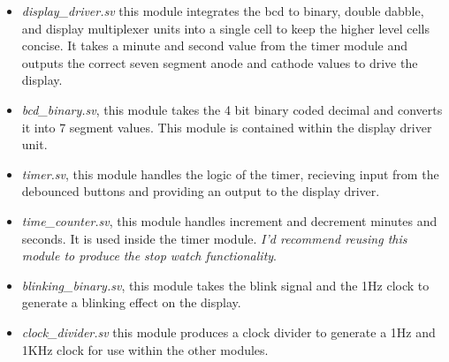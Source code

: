 \begin{itemize}
    \item \textit{display\_driver.sv} this module integrates the bcd to binary, double dabble, and display multiplexer units into a single cell to keep the higher level cells concise. It takes a minute and second value from the timer module and outputs the correct seven segment anode and cathode values to drive the display.
    
    \item \textit{bcd\_binary.sv}, this module takes the 4 bit binary coded decimal and converts it into 7 segment values. This module is contained within the display driver unit. 
    
    \item \textit{timer.sv}, this module handles the logic of the timer, recieving input from the debounced buttons and providing an output to the display driver. 
    
    \item \textit{time\_counter.sv}, this module handles increment and decrement minutes and seconds. It is used inside the timer module. \textit{I'd recommend reusing this module to produce the stop watch functionality}.
    
    \item \textit{blinking\_binary.sv}, this module takes the blink signal and the 1Hz clock to generate a blinking effect on the display.

    \item \textit{clock\_divider.sv} this module produces a clock divider to generate a 1Hz and 1KHz clock for use within the other modules.
    
    
\end{itemize}